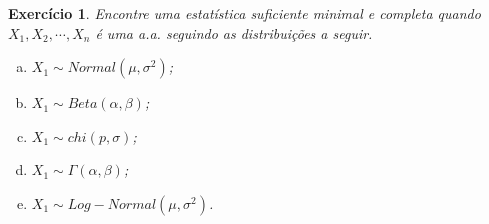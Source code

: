 \documentclass[letter,11pt]{article}
\newtheorem{exer}{Exercício}
\begin{document}
\smallskip
\begin{exer}  \rm
Encontre uma estatística suficiente minimal e completa quando $X_1,X_2,\cdots,X_n$ 
é uma a.a. seguindo as distribuições a seguir.
\begin{enumerate}[a)]
  \item $X_1\sim Normal(\mu,\sigma^2)$;
  \item $X_1\sim Beta(\alpha,\beta)$;
  \item $X_1\sim chi(p,\sigma)$;
  \item $X_1\sim \Gamma(\alpha,\beta)$;
  \item $X_1\sim Log-Normal(\mu,\sigma^2)$.
\end{enumerate}
\end{exer}
\end{document}

